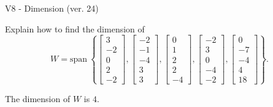 \begin{exercise}
  \begin{exerciseTitle}V8 - Dimension (ver. 24)\end{exerciseTitle}
  \begin{exerciseStatement}
    Explain how to find the dimension of 
\[W=\mathrm{span}\ \left\{\left[\begin{array}{r}
3 \\
-2 \\
0 \\
2 \\
-2
\end{array}\right] , \left[\begin{array}{r}
-2 \\
-1 \\
-4 \\
3 \\
3
\end{array}\right] , \left[\begin{array}{r}
0 \\
1 \\
2 \\
2 \\
-4
\end{array}\right] , \left[\begin{array}{r}
-2 \\
3 \\
0 \\
-4 \\
-2
\end{array}\right] , \left[\begin{array}{r}
0 \\
-7 \\
-4 \\
4 \\
18
\end{array}\right]\right\}.\]



  \end{exerciseStatement}
  \begin{exerciseAnswer}
   The dimension of \(W\) is  \(4\).
  


  \end{exerciseAnswer}
\end{exercise}